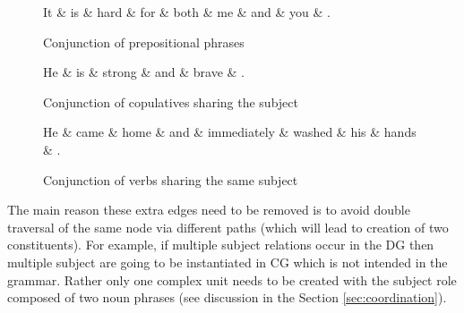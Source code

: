 \begin{figure}[H]
\centering
\begin{minipage}[b]{0.45\textwidth}
\centering
\begin{dependency}
		\begin{deptext}[]
	It \& is \& hard \& for \& both \& me \& and \& you \& . \\ %
		\end{deptext}
	\end{dependency}
\caption{Conjunction of prepositional phrases}
\label{fig:conj-preps}
\end{minipage}
\quad
\begin{minipage}[b]{0.45\textwidth}
\centering
	\begin{dependency}
		\begin{deptext}[]
	He \& is \& strong \& and \& brave \& . \\
		\end{deptext}
	\end{dependency}
\caption{Conjunction of copulatives sharing the subject}
\label{fig:conj-copula-subj}
\end{minipage}
\end{figure}
\begin{figure}[!ht]
\centering
	\begin{dependency}
		\begin{deptext}[]
	He \& came \& home \& and \& immediately \& washed \& his \& hands \& . \\ %
		\end{deptext}
	\end{dependency}
\caption{Conjunction of verbs sharing the same subject}
\label{fig:conj-verb-subj}
\end{figure}

The main reason these extra edges need to be removed is to avoid double traversal of the same node via different paths (which will lead to creation of two constituents).  For example, if multiple subject relations occur in the DG then multiple subject are going to be instantiated in CG which is not intended in the grammar. Rather only one complex unit needs to be created with the subject role composed of two noun phrases (see discussion in the Section \ref{sec:coordination}). 

